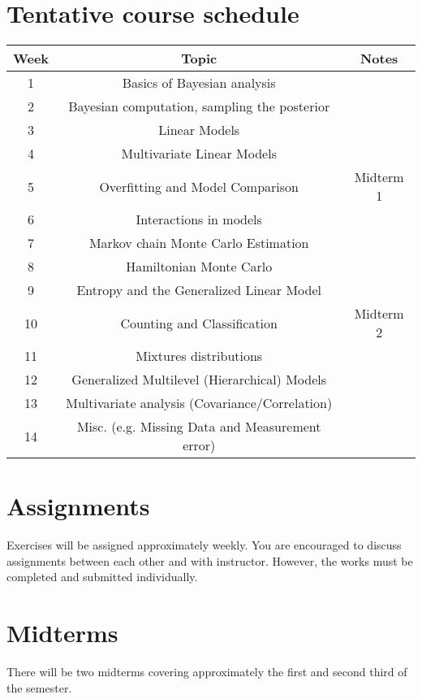 \documentclass[11pt,onecolumn]{article}
\begin{document}
\section*{Tentative course schedule}
\begin{center}
  \begin{tabular}{|c|c|c|}
    \hline
    Week & Topic & Notes \\
    \hline
    1 & Basics of Bayesian analysis & \\
    \hline
    2 & Bayesian computation, sampling the posterior & \\
    \hline
    3 & Linear Models & \\
    \hline
    4 & Multivariate Linear Models & \\
    \hline
    5 & Overfitting and Model Comparison & Midterm 1\\
    \hline
    6 & Interactions in models & \\
    \hline
    7 & Markov chain Monte Carlo Estimation & \\
    \hline
    8 & Hamiltonian Monte Carlo & \\
    \hline
    9 & Entropy and the Generalized Linear Model & \\
    \hline
    10 & Counting and Classification & Midterm 2 \\
    \hline
    11 & Mixtures distributions & \\
    \hline
    12 & Generalized Multilevel (Hierarchical) Models & \\
    \hline
    13 & Multivariate analysis (Covariance/Correlation) & \\
    \hline
    14 & Misc. (e.g. Missing Data and Measurement error) & \\
    \hline
\end{tabular}
\end{center}

\section*{Assignments}
Exercises will be assigned approximately weekly. You are encouraged to discuss  assignments between each other and with instructor. However, the works must be completed and submitted individually.

\section*{Midterms}
There will be two midterms covering approximately the first and second third of the semester.
\end{document}
